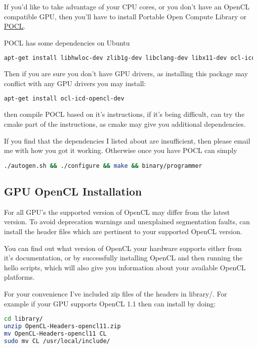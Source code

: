 \documentclass[12pt]{article}
\begin{document}
If you'd like to take advantage of your CPU cores, or
you don't have an OpenCL compatible GPU, then you'll have to install 
Portable Open Compute Library or
\href{http://pocl.sourceforge.net/}{POCL}.

POCL has some dependencies on Ubuntu
\begin{lstlisting}[language=bash]
apt-get install libhwloc-dev zlib1g-dev libclang-dev libx11-dev ocl-icd-dev cmake
\end{lstlisting}

Then if you are sure you don't have GPU drivers, as installing this package may
conflict with any GPU drivers you may install:
\begin{lstlisting}[language=bash]
apt-get install ocl-icd-opencl-dev
\end{lstlisting}

then compile POCL based on it's instructions, if it's being difficult, can try
the cmake part of the instructions, as cmake may give you additional
dependencies. 

If you find that the dependencies I listed about are insufficient, then please
email me with how you got it working.
Otherwise once you have POCL can simply 
\begin{lstlisting}[language=bash]
./autogen.sh && ./configure && make && binary/programmer
\end{lstlisting}

\subsection{GPU  OpenCL Installation}

For all GPU's the supported version of OpenCL may differ from the latest
version. To avoid deprecation warnings and unexplained segmentation faults, 
can install the header files which are pertinent to your supported OpenCL version. 

You can find out what version of OpenCL your hardware supports either from it's
documentation, or by successfully installing OpenCL and then running the hello
scripts, which will also give you information about your available OpenCL
platforms. 

For your convenience I've included zip files of the headers in library/.
For example if your GPU supports OpenCL 1.1 then can install by doing:
\begin{lstlisting}[language=bash]
cd library/
unzip OpenCL-Headers-opencl11.zip 
mv OpenCL-Headers-opencl11 CL
sudo mv CL /usr/local/include/
\end{lstlisting}
\end{document}
